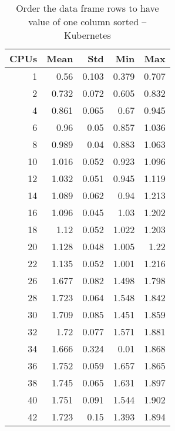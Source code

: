 \begin{table}[htbp]
\begin{minipage}{.45\textwidth}
	\caption{Order the data frame rows to have value of one column sorted -- bare metal}
	\label{tab:baremetal-order-data}
  \end{minipage}
  \hfill
  \begin{minipage}{.45\textwidth}
    \centering
    \scriptsize
\begin{tabular}{rrrrr}
\toprule
\textbf{CPUs} & \textbf{Mean} & \textbf{Std} & \textbf{Min} & \textbf{Max} \\
\midrule
1 & 0.56 & 0.103 & 0.379 & 0.707 \\
2 & 0.732 & 0.072 & 0.605 & 0.832 \\
4 & 0.861 & 0.065 & 0.67 & 0.945 \\
6 & 0.96 & 0.05 & 0.857 & 1.036 \\
8 & 0.989 & 0.04 & 0.883 & 1.063 \\
10 & 1.016 & 0.052 & 0.923 & 1.096 \\
12 & 1.032 & 0.051 & 0.945 & 1.119 \\
14 & 1.089 & 0.062 & 0.94 & 1.213 \\
16 & 1.096 & 0.045 & 1.03 & 1.202 \\
18 & 1.12 & 0.052 & 1.022 & 1.203 \\
20 & 1.128 & 0.048 & 1.005 & 1.22 \\
22 & 1.135 & 0.052 & 1.001 & 1.216 \\
26 & 1.677 & 0.082 & 1.498 & 1.798 \\
28 & 1.723 & 0.064 & 1.548 & 1.842 \\
30 & 1.709 & 0.085 & 1.451 & 1.859 \\
32 & 1.72 & 0.077 & 1.571 & 1.881 \\
34 & 1.666 & 0.324 & 0.01 & 1.868 \\
36 & 1.752 & 0.059 & 1.657 & 1.865 \\
38 & 1.745 & 0.065 & 1.631 & 1.897 \\
40 & 1.751 & 0.091 & 1.544 & 1.902 \\
42 & 1.723 & 0.15 & 1.393 & 1.894 \\
\bottomrule
\end{tabular}

	\caption{Order the data frame rows to have value of one column sorted -- Kubernetes}
	\label{tab:kube-order-data}
  \end{minipage}
\end{table}

